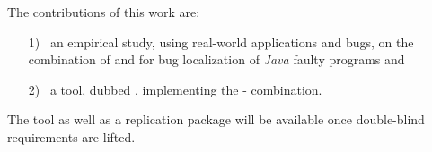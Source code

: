 \documentclass{article}
\begin{document}
The contributions of this work are:
\begin{itemize}
 \item[1)]~an empirical study, using
real-world applications and bugs, on the combination of \ds{} and
\sfl{} for bug localization of \emph{Java} faulty programs and
\item[2)]~a
tool, dubbed \comb{}, implementing the \ds{}-\sfl{} combination.
\end{itemize}
The
tool as well as a replication package will be available once
double-blind requirements are lifted.







\end{document}
